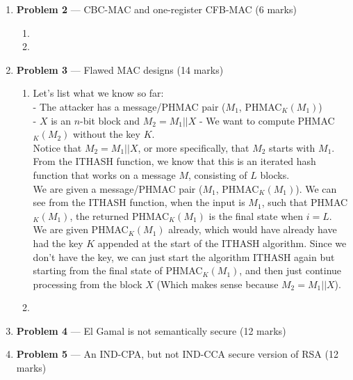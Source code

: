 \documentclass[11pt]{article}
\theoremstyle{definition}
\begin{document}
\begin{enumerate}
\newpage

\item[] \textbf{Problem 2} --- CBC-MAC and one-register CFB-MAC (6 marks)

\begin{enumerate}

\item %

\item %

\end{enumerate}

\newpage

\item[] \textbf{Problem 3} --- Flawed MAC designs (14 marks)

\begin{enumerate}

\item 
Let's list what we know so far:\\
- The attacker has a message/PHMAC pair ($M_1$, PHMAC$_K(M_1)$)\\
- $X$ is an $n$-bit block and $M_2 = M_1||X$
- We want to compute PHMAC$_K(M_2)$ without the key $K$.\\

Notice that $M_2 = M_1||X$, or more specifically, that $M_2$ starts with $M_1$.\\

From the ITHASH function, we know that this is an iterated hash function that works on a message $M$, consisting of $L$ blocks.\\

We are given a message/PHMAC pair ($M_1$, PHMAC$_K(M_1)$). We can see from the ITHASH function, when the input is $M_1$, such that PHMAC$_K(M_1)$, the returned PHMAC$_K(M_1)$ is the final state when $i = L$.\\

We are given PHMAC$_K(M_1)$ already, which would have already have had the key $K$ appended at the start of the ITHASH algorithm. Since we don't have the key, we can just start the algorithm ITHASH again but starting from the final state of PHMAC$_K(M_1)$, and then just continue processing from the block $X$ (Which makes sense because $M_2 = M_1||X$).


\item %

\end{enumerate}

\newpage

\item[] \textbf{Problem 4} --- El Gamal is not semantically secure (12 marks)

\newpage

\item[] \textbf{Problem 5} --- An IND-CPA, but not IND-CCA secure version of RSA (12 marks)

\end{enumerate}
\end{document}
